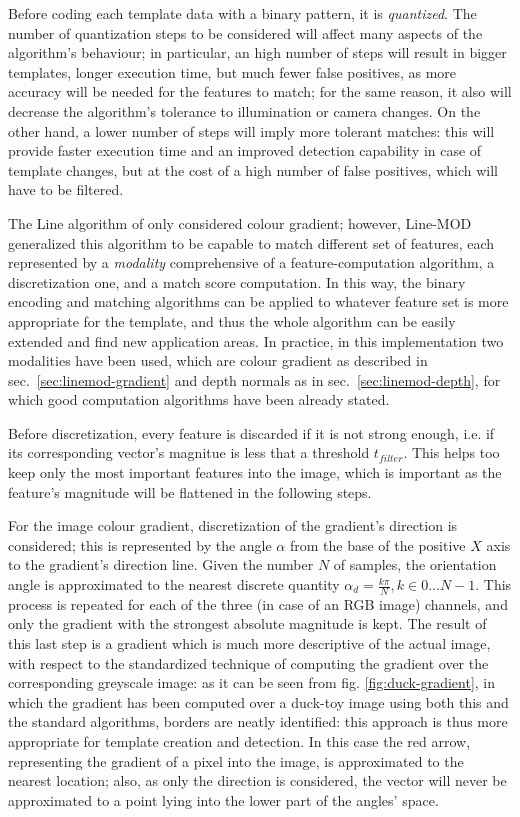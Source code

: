 Before coding each template data with a binary pattern, it is
\emph{quantized}. The number of quantization steps to be considered
will affect many aspects of the algorithm's behaviour; in particular,
an high number of steps will result in bigger templates, longer
execution time, but much fewer false positives, as more accuracy will
be needed for the features to match; for the same reason, it also will
decrease the algorithm's tolerance to illumination or camera
changes. On the other hand, a lower number of steps will imply more
tolerant matches: this will provide faster execution time and an
improved detection capability in case of template changes, but at the
cost of a high number of false positives, which will have to be filtered.

The Line algorithm of \cite{linemod-origins} only considered colour gradient; however, Line-MOD
generalized this algorithm to be capable to match different set of
features, each represented by a \emph{modality} comprehensive of a
feature-computation algorithm, a discretization one, and a match score
computation. In this way, the binary encoding and matching algorithms
can be applied to whatever feature set is more appropriate for the
template, and thus the whole algorithm can be easily extended and find
new application areas. In practice, in this implementation two
modalities have been used, which are colour gradient as described in
sec.~\ref{sec:linemod-gradient} and depth normals as in
sec.~\ref{sec:linemod-depth}, for which good computation algorithms have
been already stated.

Before discretization, every feature is discarded if it is not strong
enough, i.e. if its corresponding vector's magnitue is less that a
threshold $t_{filter}$. This helps too keep only the most important
features into the image, which is important as the feature's magnitude
will be flattened in the following steps.

For the image colour gradient, discretization of the gradient's direction is
considered; this is represented by the angle $\alpha$ from the
base of the positive $X$ axis to the gradient's direction line. Given
the number $N$ of samples, the orientation angle is approximated to
the nearest discrete quantity $\alpha_d = \frac{k\pi}{N}, k \in
{0\dots N-1}$. 
This process is repeated for each of the three (in case of an RGB
image) channels, and only the gradient with the strongest absolute
magnitude is kept. The result of this last step is a gradient which is
much more descriptive of the actual image, with respect to the
standardized technique of computing the gradient over the
corresponding greyscale image: as it can be seen from
fig. \ref{fig:duck-gradient}, in which the gradient has been computed
over a duck-toy image using both this and the standard algorithms,
borders are neatly identified: this approach is thus more appropriate for
template creation and detection. In this case the red arrow,
representing the gradient of a pixel into the image, is approximated
to the nearest location; also, as only the direction is considered,
the vector will never be approximated to a point lying into the lower
part of the angles' space.

